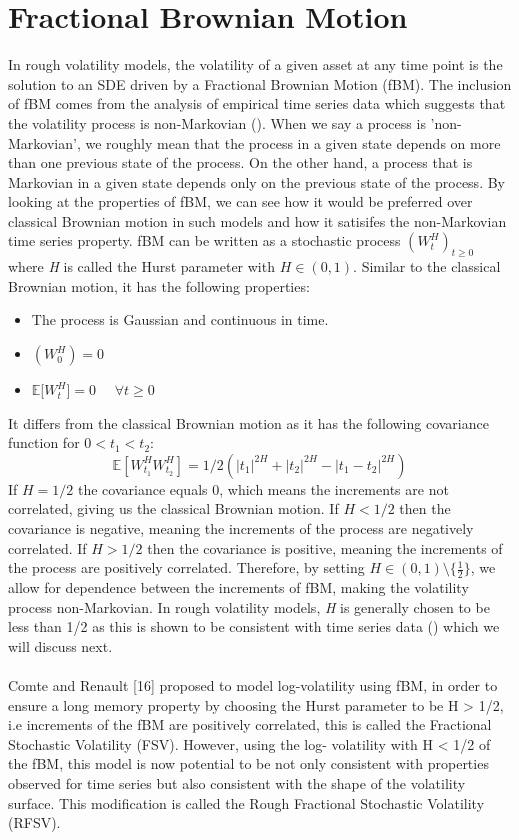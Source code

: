 \documentclass[12pt,oneside]{article}
\begin{document}
\section{Fractional Brownian Motion}
\label{sec:fractionalBm}
In rough volatility models, the volatility of a given asset at any time point is the solution to an SDE driven by a Fractional Brownian Motion (fBM). The inclusion of fBM comes from the analysis of empirical time series data which suggests that the volatility process is non-Markovian (\cite{redGATHERAL}). When we say a process is 'non-Markovian', we roughly mean that the process in a given state depends on more than one previous state of the process. On the other hand, a process that is Markovian in a given state depends only on the previous state of the process. By looking at the properties of fBM, we can see how it would be preferred over classical Brownian motion in such models and how it satisifes the non-Markovian time series property. fBM can be written as a stochastic process $(\textit{$W^H_t$})_{t\ge0}$ where \textit{H} is called the Hurst parameter with $\textit{H} \in (0,1)$. Similar to the classical Brownian motion, it has the following properties: 
\begin{itemize} \item The process is Gaussian and continuous in time. \item $(\textit{$W^H_0$})=0$  \item $\mathbb{E}$[\textit{$W^H_t$}]$=0$ \ \  $\forall t \ge 0$ \end{itemize}
It differs from the classical Brownian motion as it has the following covariance function for $0 < t_1 < t_2$: $$\mathbb{E}[\textit{$W^H_{t_1}$} \textit{$W^H_{t_2}$}] = 1/2 (|t_1|^{2H}+|t_2|^{2H}-|t_1-t_2|^{2H})$$ If $H=1/2$ the covariance equals $0$, which means the increments are not correlated, giving us the classical Brownian motion. If $H<1/2$ then the covariance is negative, meaning the increments of the process are negatively correlated. If $H>1/2$ then the covariance is positive, meaning the increments of the process are positively correlated.  Therefore, by setting $H\in(0,1)\setminus\{\frac{1}{2}\}$, we allow for dependence between the increments of fBM, making the volatility process non-Markovian.  In rough volatility models, \textit{H} is generally chosen to be less than 1/2 as this is shown to be consistent with time series data (\cite{GATHERAL}) which we will discuss next.
\\
\\
Comte and Renault [16] proposed to model log-volatility using fBM, in order to ensure a long memory property by choosing the Hurst parameter to be H > 1/2, i.e increments of the fBM are positively correlated, this is called the Fractional Stochastic Volatility (FSV). However, using the log- volatility with H < 1/2 of the fBM, this model is now potential to be not only consistent with properties observed for time series but also consistent with the shape of the volatility surface. This modification is called the Rough Fractional Stochastic Volatility (RFSV).
\end{document}
